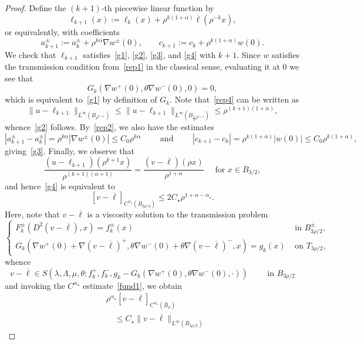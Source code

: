 \documentclass[letter,11pt]{amsart}
\newcommand{\mao}{\alpha_{\star}}
\theoremstyle{definition}
\numberwithin{equation}{section}
\begin{document}
\begin{proof}
Define the $(k+1)$-th piecewise linear function by 
\[
\ell_{k+1}(x) := \ell_k(x) + \rho^{k (1+ \alpha)} \textstyle\overline{\ell}\left(\rho^{-k} x \right),
\]
or equivalently, with coefficients
\[
a^{\pm}_{k+1} := a^{\pm}_k + \rho^{k\alpha} \nabla w^{\pm}(0), \qquad c_{k+1} := c_k + \rho^{k(1+\alpha)} w(0).
\]
We check that $\ell_{k+1}$ satisfies~\eqref{g1}, \eqref{g2}, \eqref{g3}, and \eqref{g4} with $k+1$.
Since $w$ satisfies the transmission condition from~\eqref{rep1} in the classical sense, evaluating it at $0$ we see that
\[
G_k(\nabla w^{+}(0), \theta \nabla w^{-}(0), 0) = 0,
\]
which is equivalent to~\eqref{g1} by definition of $G_k$.
Note that~\eqref{rep4} can be written as 
\[
\|u - \ell_{k+1}\|_{L^{\infty}(B_{\rho^{k+1}})} 
\leq \|u - \ell_{k+1}\|_{L^{\infty}(B_{\frac{3}{2}\rho^{k+1}})} 
\leq \rho^{(k+1)(1+\alpha)},
\]
whence~\eqref{g2} follows.
By~\eqref{rep2}, we also have the estimates
\[
|a_{k+1}^{\pm} - a_k^{\pm}| = \rho^{k \alpha} |\nabla w^{\pm}(0)| 
\leq C_0 \rho^{k\alpha}
\qquad \text{ and } \qquad
|c_{k+1} - c_k|
= \rho^{k (1+\alpha)} |w(0)|
\leq C_0 \rho^{k(1+\alpha)},
\]
giving~\eqref{g3}.
Finally, we observe that
\[
\frac{(u - \ell_{k+1})(\rho^{k+1}x)}{\rho^{(k+1)(\alpha+1)}} = \frac{(v - \overline{\ell})(\rho x)}{\rho^{1+\alpha}} \quad \text{ for } x \in \overline{B}_{3/2},
\]
and hence~\eqref{g4} is equivalent to
\begin{equation}
\label{g5}
[v - \overline{\ell}]_{C^{\mao}(\overline{B}_{3\rho/4})} \leq 2 C_{\star} \rho^{1+\alpha-\mao}.
\end{equation}
Here, note that $v - \overline{\ell}$ is a viscosity solution to the transmission problem
\[
\begin{cases}
F^{\pm}_k(D^2 (v - \overline{\ell}), x) = f^{\pm}_k(x) & \text{ in } B_{3\rho/2}^{\pm},\\
G_k(\nabla w^{+}(0) + \nabla (v - \overline{\ell})^{+}, \theta \nabla w^{-}(0) + \theta \nabla (v - \overline{\ell})^{-}, x) = g_k(x) & \text{ on } T_{3\rho/2},
\end{cases}
\]
whence
\[
v - \overline{\ell} \in S(\lambda, \Lambda, \mu, \theta; f_k^{+}, f_k^{-}, g_k- G_k(\nabla w^{+}(0), \theta \nabla w^{-}(0), \cdot))
\qquad \text{ in } B_{3\rho/2}
\]
and invoking the $C^{\mao}$ estimate~\eqref{fund1}, we obtain
\begin{equation}
\label{g6}
\begin{split}
&\rho^{\mao} [v - \overline{\ell}]_{C^{\mao}(\overline{B}_{\rho})}\\
& \quad \leq 
C_{\star}\|v- \overline{\ell}\|_{L^{\infty}(B_{3\rho/2})} 

\end{split}
\end{equation}
\end{proof}
\end{document}
